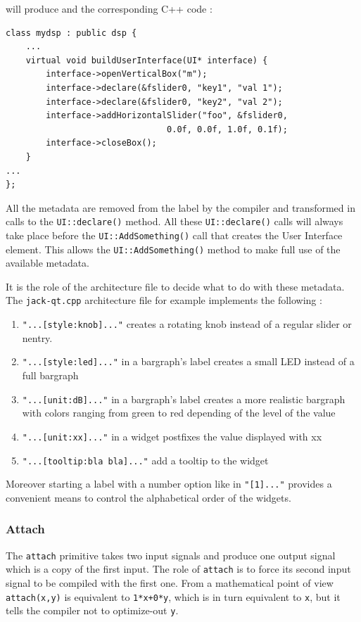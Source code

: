 \documentclass[a4paper,10pt]{book}
\begin{document}
will produce and the corresponding C++ code :

\begin{lstlisting}
class mydsp : public dsp {
	...
	virtual void buildUserInterface(UI* interface) {
	    interface->openVerticalBox("m");
	    interface->declare(&fslider0, "key1", "val 1");
	    interface->declare(&fslider0, "key2", "val 2");
	    interface->addHorizontalSlider("foo", &fslider0, 
								0.0f, 0.0f, 1.0f, 0.1f);
	    interface->closeBox();
	}
...
};
\end{lstlisting}

All the metadata are removed from the label by the compiler and 
transformed in calls to the \lstinline'UI::declare()' method. All these 
\lstinline'UI::declare()' calls will always take place before the \lstinline'UI::AddSomething()' 
call that creates the User Interface element. This allows the 
\lstinline'UI::AddSomething()'  method to make full use of the available metadata.

It is the role of the architecture file to decide what to do with these 
metadata. The \lstinline'jack-qt.cpp' architecture file for example implements the 
following :
\begin{enumerate}
\item \lstinline'"...[style:knob]..."' creates a rotating knob instead of a regular 
slider or nentry.
\item \lstinline'"...[style:led]..."' in a bargraph's label creates a small LED instead 
of a full bargraph
\item \lstinline'"...[unit:dB]..."' in a bargraph's label creates a more realistic 
bargraph with colors ranging from green to red depending of the level of 
the value
\item \lstinline'"...[unit:xx]..."' in a widget postfixes the value displayed with xx
\item \lstinline'"...[tooltip:bla bla]..."' add a tooltip to the widget
\end{enumerate}

Moreover starting a label with a number option like in \lstinline'"[1]..."' provides
a convenient means to control the alphabetical order of the widgets.

\subsubsection{Attach}
The \lstinline'attach' primitive takes two input signals and produce one output signal which is a copy of the first input. The role of \lstinline'attach' is to force its second input signal to be compiled with the first one. From a mathematical point of view \lstinline'attach(x,y)' is equivalent to \lstinline'1*x+0*y', which is in turn equivalent to \lstinline'x', but it tells the compiler not to optimize-out \lstinline'y'.
\end{document}
